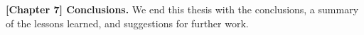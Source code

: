 \textbf{[Chapter 7] Conclusions.} We end this thesis with the conclusions, a summary of the lessons learned, and suggestions for further work.





%
%